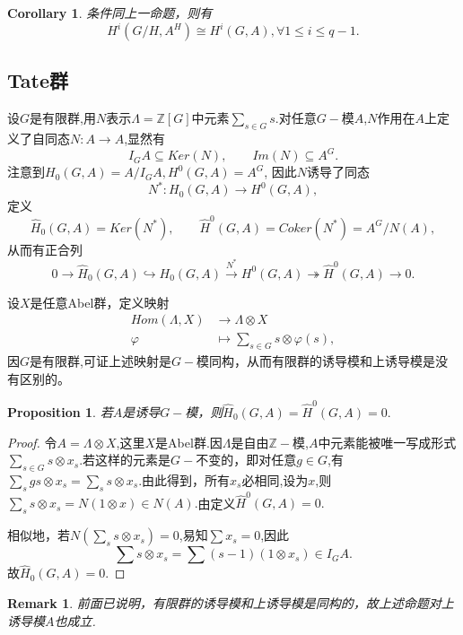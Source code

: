 \documentclass[UTF8]{article}
\newtheorem{cor}{Corollary}[section]
\newtheorem{prop}{Proposition}[section]
\newtheorem{Rem}{Remark}[section]
\begin{document}
\begin{cor}
	条件同上一命题，则有
	$$
	H^{i}(G/H,A^{H})\cong H^{i}(G,A),\forall 1\leq i\leq q-1.
	$$
\end{cor}

\subsection{Tate群}

设$G$是有限群,用$N$表示$\Lambda=\mathbb{Z}[G]$中元素$\sum_{s\in G}s.$对任意$G-$模$A$,$N$作用在$A$上定义了自同态$N:A\rightarrow A$,显然有
$$
I_{G}A\subseteq Ker(N),\qquad Im(N)\subseteq A^{G}.
$$
注意到$H_{0}(G,A)=A/I_{G}A,H^{0}(G,A)=A^{G}$,
因此$N$诱导了同态
$$
N^{*}:H_{0}(G,A)\rightarrow H^{0}(G,A),
$$
定义$$
\widehat{H}_{0}(G,A)=Ker(N^{*}),\qquad \widehat{H}^{0}(G,A)=Coker(N^{*})=A^{G}/N(A),
$$
从而有正合列
$$
0\rightarrow \widehat{H}_{0}(G,A)\hookrightarrow H_{0}(G,A)\stackrel{N^{*}}{\longrightarrow }H^{0}(G,A)\twoheadrightarrow \widehat{H}^{0}(G,A)\rightarrow 0.
$$

设$X$是任意Abel群，定义映射
\[
\begin{split}
Hom(\Lambda,X)&\rightarrow \Lambda\otimes X\\
\varphi&\mapsto\sum_{s\in G}s\otimes \varphi(s),
\end{split}
\]
因$G$是有限群,可证上述映射是$G-$模同构，从而有限群的诱导模和上诱导模是没有区别的。
\begin{prop}
	若$A$是诱导$G-$模，则$\widehat{H}_{0}(G,A)=\widehat{H}^{0}(G,A)=0.$
\end{prop}
\begin{proof}
令$A=\Lambda\otimes X$,这里$X$是Abel群.因$\Lambda$是自由$\mathbb{Z}-$模,$A$中元素能被唯一写成形式$\sum\limits_{s\in G}s\otimes x_{s}$.若这样的元素是$G-$不变的，即对任意$g\in G$,有$\sum\limits_{s}gs\otimes 
x_{s}=\sum\limits_{s}s\otimes x_{s}$.由此得到，所有$x_{s}$必相同,设为$x$,则$\sum\limits_{s}s\otimes x_{s}=N(1\otimes x)\in N(A).$由定义$\widehat{H}^{0}(G,A)=0.$


相似地，若$N(\sum\limits_{s}s\otimes x_{s})=0$,易知$\sum x_{s}=0$,因此
$$
\sum s\otimes x_{s}=\sum (s-1)(1\otimes x_{s})\in I_{G}A.
$$
故$\widehat{H}_{0}(G,A)=0.$
\end{proof}
\begin{Rem}

前面已说明，有限群的诱导模和上诱导模是同构的，故上述命题对上诱导模$A$也成立.\end{Rem}
\end{document}

